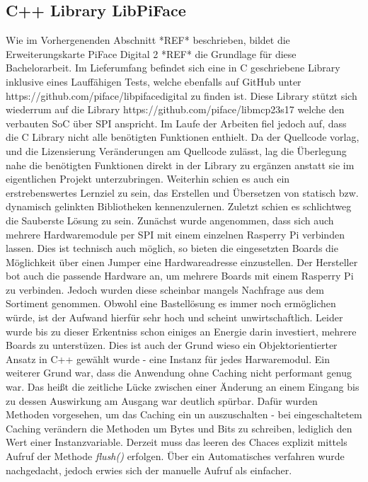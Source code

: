 

\renewcommand{\pthImg}{\pthUmsetzung/img}
\renewcommand{\pthDoc}{\pthUmsetzung/doc}

\subsection{C++ Library LibPiFace}
Wie im Vorhergenenden Abschnitt *REF* beschrieben, bildet die Erweiterungskarte PiFace Digital 2 *REF* die Grundlage für diese Bachelorarbeit. Im Lieferumfang befindet sich eine in C geschriebene Library inklusive eines Lauffähigen Tests, welche ebenfalls auf GitHub unter https://github.com/piface/libpifacedigital zu finden ist. Diese Library stützt sich wiederrum auf die Library https://github.com/piface/libmcp23s17 welche den verbauten SoC über SPI anspricht. Im Laufe der Arbeiten fiel jedoch auf, dass die C Library nicht alle benötigten Funktionen enthielt. Da der Quellcode vorlag, und die Lizensierung Veränderungen am Quellcode zulässt, lag die Überlegung nahe die benötigten Funktionen direkt in der Library zu ergänzen anstatt sie im eigentlichen Projekt unterzubringen. Weiterhin schien es auch ein erstrebenswertes Lernziel zu sein, das Erstellen und Übersetzen von statisch bzw. dynamisch gelinkten Bibliotheken kennenzulernen. Zuletzt schien es schlichtweg die Sauberste Lösung zu sein. Zunächst wurde angenommen, dass sich auch mehrere Hardwaremodule per SPI mit einem einzelnen Rasperry Pi verbinden lassen. Dies ist technisch auch möglich, so bieten die eingesetzten Boards die Möglichkeit über einen Jumper eine Hardwareadresse einzustellen. Der Hersteller bot auch die passende Hardware an, um mehrere Boards mit einem Rasperry Pi zu verbinden. Jedoch wurden diese scheinbar mangels Nachfrage aus dem Sortiment genommen. Obwohl eine Bastellösung es immer noch ermöglichen würde, ist der Aufwand hierfür sehr hoch und scheint unwirtschaftlich. Leider wurde bis zu dieser Erkentniss schon einiges an Energie darin investiert, mehrere Boards zu unterstüzen. Dies ist auch der Grund wieso ein Objektorientierter Ansatz in C++ gewählt wurde - eine Instanz für jedes Harwaremodul. Ein weiterer Grund war, dass die Anwendung ohne Caching nicht performant genug war. Das heißt die zeitliche Lücke zwischen einer Änderung an einem Eingang bis zu dessen Auswirkung am Ausgang war deutlich spürbar. Dafür wurden Methoden vorgesehen, um das Caching ein un auszuschalten - bei eingeschaltetem Caching verändern die Methoden um Bytes und Bits zu schreiben, lediglich den Wert einer Instanzvariable. Derzeit muss das leeren des Chaces explizit mittels Aufruf der Methode \textit{flush()} erfolgen. Über ein Automatisches verfahren wurde nachgedacht, jedoch erwies sich der manuelle Aufruf als einfacher. 

